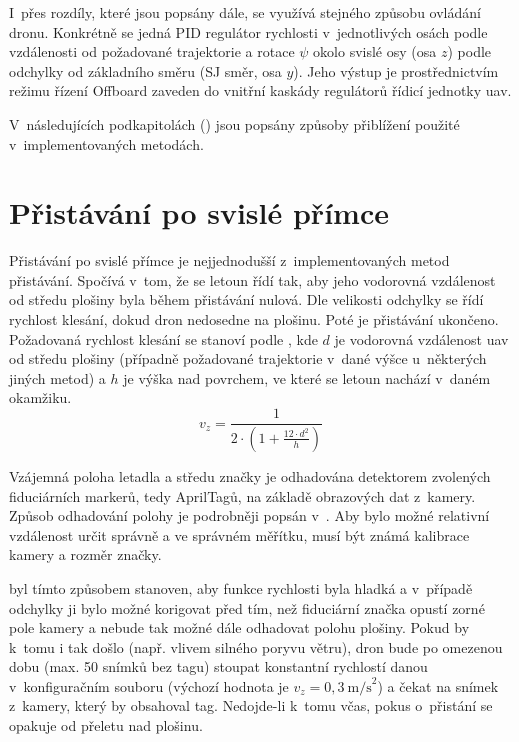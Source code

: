     I~přes rozdíly, které jsou popsány dále, se využívá stejného způsobu ovládání dronu. Konkrétně se jedná PID regulátor rychlosti v~jednotlivých osách podle vzdálenosti od požadované trajektorie a rotace $\psi$ okolo svislé osy (osa $z$) podle odchylky od základního směru (SJ směr, osa $y$). Jeho výstup je prostřednictvím režimu řízení Offboard zaveden do vnitřní kaskády regulátorů řídicí jednotky \acrshort{uav}.
    
    V~následujících podkapitolách () jsou popsány způsoby přiblížení použité v~implementovaných metodách.

    \section{Přistávání po svislé přímce} \label{sec:offboardpid}
        Přistávání po svislé přímce je nejjednodušší z~implementovaných metod přistávání. Spočívá v~tom, že se letoun řídí tak, aby jeho vodorovná vzdálenost od středu plošiny byla během přistávání nulová. Dle velikosti odchylky se řídí rychlost klesání, dokud dron nedosedne na plošinu. Poté je přistávání ukončeno. Požadovaná rychlost klesání se stanoví podle , kde $d$ je vodorovná vzdálenost \acrshort{uav} od středu plošiny (případně požadované trajektorie v~dané výšce u~některých jiných metod) a $h$ je výška nad povrchem, ve které se letoun nachází v~daném okamžiku.
        \begin{equation} \label{eq:vz}
            v_z = \frac{1}{2\cdot\left(1+\frac{12\cdot d^2}{h}\right)}
        \end{equation}

        Vzájemná poloha letadla a středu značky je odhadována detektorem zvolených fiduciárních markerů, tedy AprilTagů, na základě obrazových dat z~kamery. Způsob odhadování polohy je podrobněji popsán v~. Aby bylo možné relativní vzdálenost určit správně a ve správném měřítku, musí být známá kalibrace kamery a rozměr značky.

         byl tímto způsobem stanoven, aby funkce rychlosti byla hladká a v~případě odchylky ji bylo možné korigovat před tím, než fiduciární značka opustí zorné pole kamery a nebude tak možné dále odhadovat polohu plošiny. Pokud by k~tomu i tak došlo (např. vlivem silného poryvu větru), dron bude po omezenou dobu (max. 50 snímků bez tagu) stoupat konstantní rychlostí danou v~konfiguračním souboru (výchozí hodnota je $v_z=0{,}3~\mathrm{m/s}^2$) a čekat na snímek z~kamery, který by obsahoval tag. Nedojde-li k~tomu včas, pokus o~přistání se opakuje od přeletu nad plošinu. %
        
